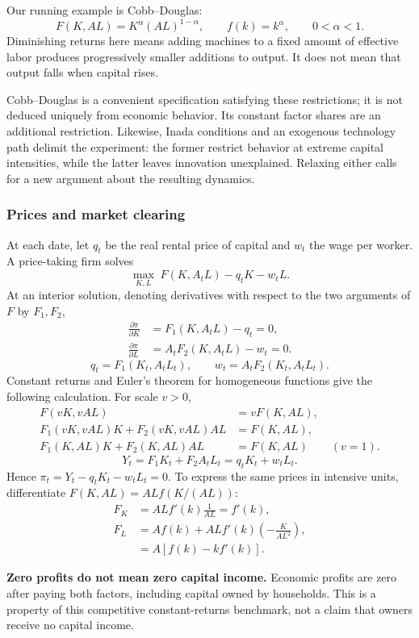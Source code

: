 Our running example is Cobb--Douglas:
\begin{equation}\label{eq:solow-cd}
F(K,AL)=K^\alpha(AL)^{1-\alpha},\qquad f(k)=k^\alpha,
\qquad 0<\alpha<1.
\end{equation}
Diminishing returns here means adding machines to a fixed amount of effective
labor produces progressively smaller additions to output. It does not mean
that output falls when capital rises.

Cobb--Douglas is a convenient specification satisfying these restrictions;
it is not deduced uniquely from economic behavior. Its constant factor shares
are an additional restriction. Likewise, Inada conditions and an exogenous
technology path delimit the experiment: the former restrict behavior at
extreme capital intensities, while the latter leaves innovation unexplained.
Relaxing either calls for a new argument about the resulting dynamics.

\subsubsection{Prices and market clearing}

At each date, let $q_t$ be the real rental price of capital and $w_t$ the wage
per worker. A price-taking firm solves
\begin{equation}
\max_{K,L}\;F(K,A_tL)-q_tK-w_tL.
\end{equation}
At an interior solution, denoting derivatives with respect to the two arguments
of $F$ by $F_1,F_2$,
\begin{align}
\frac{\partial\pi}{\partial K}&=F_1(K,A_tL)-q_t=0,\\
\frac{\partial\pi}{\partial L}&=A_tF_2(K,A_tL)-w_t=0.
\end{align}
\begin{equation}
q_t=F_1(K_t,A_tL_t),\qquad w_t=A_tF_2(K_t,A_tL_t).
\end{equation}
Constant returns and Euler's theorem for homogeneous functions give
the following calculation. For scale $v>0$,
\begin{align}
F(vK,vAL)&=vF(K,AL),\\
F_1(vK,vAL)K+F_2(vK,vAL)AL&=F(K,AL),\\
F_1(K,AL)K+F_2(K,AL)AL&=F(K,AL)\qquad(v=1).
\end{align}
\begin{equation}
Y_t=F_1K_t+F_2A_tL_t=q_tK_t+w_tL_t.
\end{equation}
Hence $\pi_t=Y_t-q_tK_t-w_tL_t=0$. To express the same prices in intensive
units, differentiate $F(K,AL)=ALf(K/(AL))$:
\begin{align}
F_K&=ALf'(k)\frac{1}{AL}=f'(k),\\
F_L&=Af(k)+ALf'(k)\left(-\frac{K}{AL^2}\right),\\
 &=A[f(k)-kf'(k)].
\end{align}
\begin{blueblock}
\textbf{Zero profits do not mean zero capital income.}
Economic profits are zero after paying both factors, including capital owned
by households. This is a property of this competitive constant-returns
benchmark, not a claim that owners receive no capital income.
\end{blueblock}

